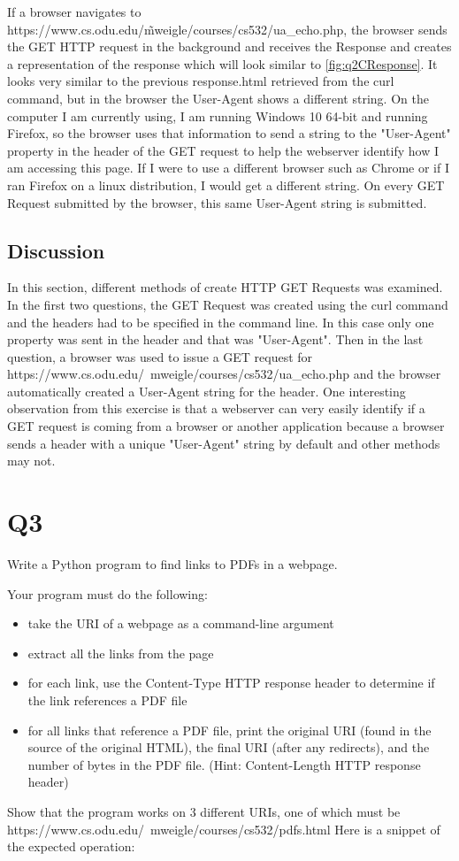 \documentclass[12pt]{article}
\begin{document}
If a browser navigates to https://www.cs.odu.edu/\~mweigle/courses/cs532/ua\_echo.php, the browser sends the GET HTTP request in the background and receives the Response and creates a representation of
 the response which will look similar to \ref{fig:q2CResponse}. It looks very similar to the previous response.html retrieved from the curl command, but in the browser the User-Agent shows a different string. On
the computer I am currently using, I am running Windows 10 64-bit and running Firefox, so the browser uses that information to send a string to the "User-Agent" property in the header of the GET request to help the webserver identify
how I am accessing this page. If I were to use a different browser such as Chrome or if I ran Firefox on a linux distribution, I would get a different string. On every GET Request submitted by the browser, this same
User-Agent string is submitted.

\subsection*{Discussion}
In this section, different methods of create HTTP GET Requests was examined. In the first two questions, the GET Request was created using the curl command and the headers had to be specified in the command line. In this case only one property was sent in the header and that was "User-Agent".  Then in the last question, a browser was used to issue a GET request for https://www.cs.odu.edu/~mweigle/courses/cs532/ua\_echo.php and the browser automatically created a User-Agent string for the header. One interesting observation from this exercise is that a webserver can very easily identify if a GET request is coming from a browser or another application because a browser sends a header with a unique "User-Agent" string by default and other methods may not. 
\section*{Q3}
Write a Python program to find links to PDFs in a webpage.

Your program must do the following:
\begin{itemize}
    \item take the URI of a webpage as a command-line argument
    \item extract all the links from the page
    \item for each link, use the Content-Type HTTP response header to determine if the link references a PDF file
    \item for all links that reference a PDF file, print the original URI (found in the source of the original HTML), the final URI (after any redirects), and the number of bytes in the PDF file. (Hint: Content-Length HTTP response header)
\end{itemize}
Show that the program works on 3 different URIs, one of which must be https://www.cs.odu.edu/~mweigle/courses/cs532/pdfs.html
Here is a snippet of the expected operation:
\end{document}

